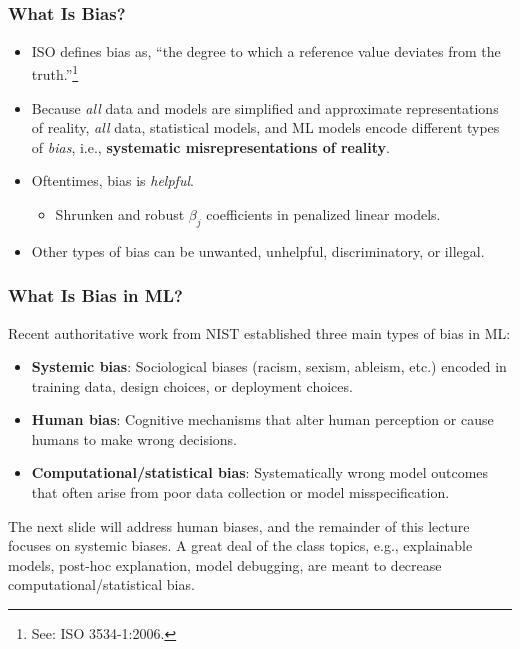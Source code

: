 \documentclass[11pt,aspectratio=169,hyperref={colorlinks}]{beamer}
\begin{document}
		\subsection*{}
	
		\begin{frame}
		
			\frametitle{What Is Bias?}			
					
			\begin{itemize}
			\item ISO defines bias as, ``the degree to which a reference value deviates from the truth.''\footnote{See: ISO 3534-1:2006.} 
			\item Because \textit{all} data and models are simplified and approximate representations of reality, \textit{all} data, statistical models, and ML models encode different types of \textit{bias}, i.e., \textbf{systematic misrepresentations of reality}.\\
			\item Oftentimes, bias is \textit{helpful}.
				\begin{itemize}
					\item{Shrunken and robust $\beta_j$ coefficients in penalized linear models.}	\end{itemize}
			\item Other types of bias can be unwanted, unhelpful, discriminatory, or illegal. 

			\end{itemize}
		
		\end{frame}
		
		\begin{frame}
		
			\frametitle{What Is Bias in ML?}	
			
		Recent authoritative work from NIST \cite{schwartz2022towards} established three main types of bias in ML: 
		
			\begin{itemize}
				\item \textbf{Systemic bias}: Sociological biases (racism, sexism, ableism, etc.) encoded in training data, design choices, or deployment choices.  
				\item \textbf{Human bias}: Cognitive mechanisms that alter human perception or cause humans to make wrong decisions.
				\item \textbf{Computational/statistical bias}: Systematically wrong model outcomes that often arise from poor data collection or model misspecification. 
			\end{itemize}
			
		The next slide will address human biases, and the remainder of this lecture focuses on systemic biases. A great deal of the class topics, e.g., explainable models, post-hoc explanation, model debugging, are meant to decrease computational/statistical bias.
			
		\end{frame}					
		
\end{document}
